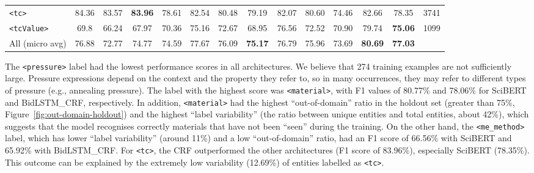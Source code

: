 \begin{table}
{\begin{tabular}{l ccc ccc ccc ccc r}
            \texttt{<tc>}         & 84.36                            & 83.57                                     & \textbf{83.96}                                     & 78.61      & 82.54      & 80.48          & 79.19          & 82.07      & 80.60          & 74.46      & 82.66          & 78.35          & 3741 \\
            \texttt{<tcValue>}    & 69.8                             & 66.24                                     & 67.97                                              & 70.36      & 75.16      & 72.67          & 68.95          & 76.56      & 72.52          & 70.90      & 79.74          & \textbf{75.06} & 1099 \\
            \midrule
            All (micro avg)       & 76.88                            & 72.77                                     & 74.77                                              & 74.59      & 77.67      & 76.09          & \textbf{75.17} & 76.79      & 75.96          & 73.69      & \textbf{80.69} & \textbf{77.03}        \\
            \bottomrule
        \end{tabular}
    }
    
    \label{tab:evaluation-superconductors-ML-model} 
\end{table}

The \texttt{<pressure>} label had the lowest performance scores in all architectures. We believe that 274 training examples are not sufficiently large. 
Pressure expressions depend on the context and the property they refer to, so in many occurrences, they may refer to different types of pressure (e.g., annealing pressure).
The label with the highest score was \texttt{<material>}, with F1 values of 80.77\% and 78.06\% for SciBERT and BidLSTM\_CRF, respectively. In addition, \texttt{<material>} had the highest ``out-of-domain'' ratio in the holdout set (greater than 75\%, Figure~\ref{fig:out-domain-holdout}) and the highest ``label variability'' (the ratio between unique entities and total entities, about 42\%), which suggests that the model recognises correctly materials that have not been ``seen'' during the training.
On the other hand, the \texttt{<me\_method>} label, which has lower ``label variability'' (around 11\%) and a low ``out-of-domain'' ratio, had an F1 score of 66.56\% with SciBERT and 65.92\% with BidLSTM\_CRF.
For \texttt{<tc>}, the CRF outperformed the other architectures (F1 score of 83.96\%), especially SciBERT (78.35\%). 
This outcome can be explained by the extremely low variability (12.69\%) of entities labelled as \texttt{<tc>}.

